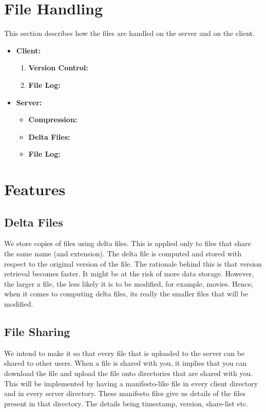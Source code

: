 \documentclass[]{article}
\begin{document}
\subsection{ }

\section{File Handling}
This section describes how the files are handled on the server and on the client.
\begin{itemize}
\item \textbf{Client:}
	\begin{enumerate}
	\item \textbf{Version Control:}
	\item \textbf{File Log:}
	
	\end{enumerate}
\item \textbf{Server:}
\begin{itemize}
\item \textbf{Compression:}
\item \textbf{Delta Files:}
\item \textbf{File Log:}
\end{itemize}

\end{itemize}

\section{Features}
\subsection{Delta Files}
We store copies of files using delta files. This is applied only to files that share the same name (and extension). The delta file is computed and stored with respect to the original version of the file. The rationale behind this is that version retrieval becomes faster. It might be at the risk of more data storage. However, the larger a file, the less likely it is to be modified, for example, movies. Hence, when it comes to computing delta files, its really the smaller files that will be modified.
\subsection{File Sharing}
We intend to make it so that every file that is uploaded to the server can be shared to other users. When a file is shared with you, it implies that you can download the file and upload the file onto directories that are shared with you. This will be implemented by having a manifesto-like file in every client directory and in every server directory.
These manifesto files give us details of the files present in that directory. The details being timestamp, version, share-list etc.
\end{document}
